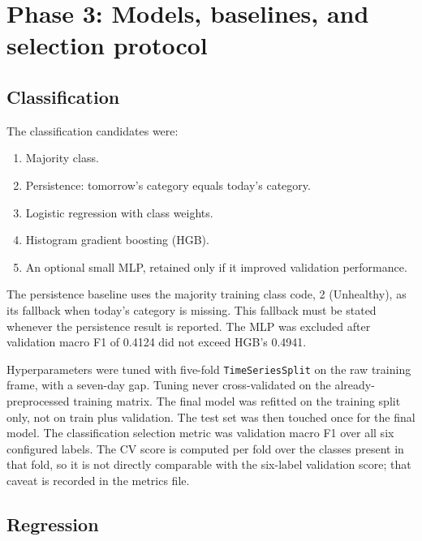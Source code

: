 ﻿%
\section{Phase 3: Models, baselines, and selection protocol}

\subsection{Classification}

The classification candidates were:

\begin{enumerate}[leftmargin=1.4em]
  \item Majority class.
  \item Persistence: tomorrow's category equals today's category.
  \item Logistic regression with class weights.
  \item Histogram gradient boosting (HGB).
  \item An optional small MLP, retained only if it improved validation performance.
\end{enumerate}

The persistence baseline uses the majority training class code, 2 (Unhealthy), as its fallback when today's category is missing. This fallback must be stated whenever the persistence result is reported. The MLP was excluded after validation macro F1 of 0.4124 did not exceed HGB's 0.4941.

Hyperparameters were tuned with five-fold \texttt{TimeSeriesSplit} on the raw training frame, with a seven-day gap. Tuning never cross-validated on the already-preprocessed training matrix. The final model was refitted on the training split only, not on train plus validation. The test set was then touched once for the final model. The classification selection metric was validation macro F1 over all six configured labels. The CV score is computed per fold over the classes present in that fold, so it is not directly comparable with the six-label validation score; that caveat is recorded in the metrics file.



\subsection{Regression}


